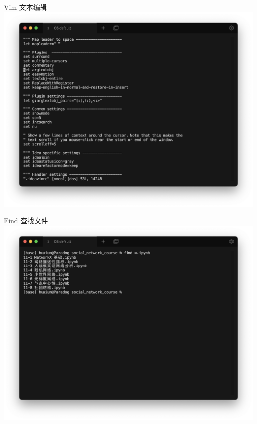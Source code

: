 \documentclass[UTF8, 16pt]{beamer}
\begin{document}
\begin{frame}
    \centering
    \textcolor{sufered}{Vim 文本编辑}
    \includegraphics[width=0.95\linewidth]{vim.png}
\end{frame}

\begin{frame}
    \centering
    \textcolor{sufered}{Find 查找文件}
    \includegraphics[width=0.95\linewidth]{find.png}
\end{frame}
\end{document}
